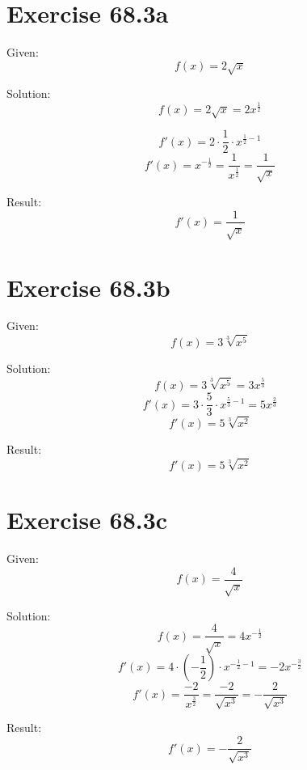 \documentclass[a4paper, 10pt]{scrartcl}
\begin{document}
\section{Exercise 68.3a}

Given:
\[f(x) = 2\sqrt{x}\]

Solution:
\[f(x) = 2\sqrt{x} = 2x^{\frac{1}{2}}\]

\[f'(x) = 2\cdot\frac{1}{2}\cdot x^{\frac{1}{2} - 1}\]
\[f'(x) = x^{-\frac{1}{2}} = \frac{1}{x^\frac{1}{2}} = \frac{1}{\sqrt{x}}\]

Result:
\[f'(x) = \frac{1}{\sqrt{x}}\]

\section{Exercise 68.3b}

Given:
\[f(x) = 3\sqrt[3]{x^5}\]

Solution:
\[f(x) = 3\sqrt[3]{x^5} = 3x^{\frac{5}{3}}\]
\[f'(x) = 3\cdot\frac{5}{3}\cdot x^{\frac{5}{3} - 1} = 5x^{\frac{2}{3}}\]
\[f'(x) = 5\sqrt[3]{x^2}\]

Result:
\[f'(x) = 5\sqrt[3]{x^2}\]

\section{Exercise 68.3c}

Given:
\[f(x) = \frac{4}{\sqrt{x}}\]

Solution:
\[f(x) = \frac{4}{\sqrt{x}} = 4x^{-\frac{1}{2}}\]
\[f'(x) = 4\cdot(-\frac{1}{2})\cdot x^{-\frac{1}{2} - 1} = -2x^{-\frac{3}{2}}\]
\[f'(x) = \frac{-2}{x^{\frac{3}{2}}} = \frac{-2}{\sqrt{x^{3}}} = -\frac{2}{\sqrt{x^{3}}}\]

Result:
\[f'(x) = -\frac{2}{\sqrt{x^{3}}}\]
\end{document}
